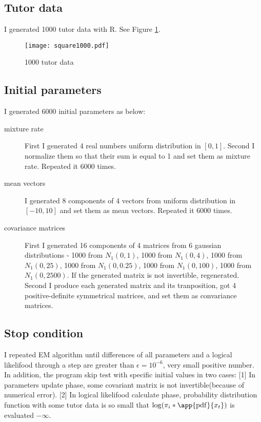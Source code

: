 \documentclass[uplatex]{jsarticle}
\begin{document}
    \subsection{Tutor data}
      \indent
	I generated 1000 tutor data with R. See Figure \ref{fig:square1000}.
	\begin{figure}[h]
	\centering
	\texttt{[image: square1000.pdf]}
	\caption{1000 tutor data}
	\label{fig:square1000}
	\end{figure}
      \par
    \subsection{Initial parameters}
      \indent
	I generated 6000 initial parameters as below:
	\begin{description}
	  \item[mixture rate] First I generated 4 real numbers uniform distribution in $[0,1]$. Second I normalize them so that their sum is equal to 1 and set them as mixture rate. Repeated it 6000 times.
	  \item[mean vectors] I generated 8 components of 4 vectors from uniform distribution in $[-10,10]$ and set them as mean vectors. Repeated it 6000 times.
	  \item[covariance matrices] First I generated 16 components of 4 matrices from 6 gaussian distributions - 1000 from $N_1(0,1)$, 1000 from $N_1(0,4)$, 1000 from $N_1(0,25)$, 1000 from $N_1(0,0.25)$, 1000 from $N_1(0,100)$, 1000 from $N_1(0,2500)$. If the generated matrix is not invertible, regenerated. Second I produce each generated matrix and its tranposition, got 4 positive-definite symmetrical matrices, and set them as convariance matrices.
	\end{description}
      \par
    \subsection{Stop condition}
      \indent
	I repeated EM algorithm until differences of all parameters and a logical likelifood through a step are greater than $\epsilon = 10^{-6}$, very small positive number. In addition, the program skip test with specific initial values in two cases: [1] In parameters update phase, some covariant matrix is not invertible(because of numerical error). [2] In logical likelifood calculate phase, probability distribution function with some tutor data is so small that $\log (\pi_i * \app{\mathrm{pdf}}{x_t})$ is evaluated $-\infty$.
      \par
\end{document}
